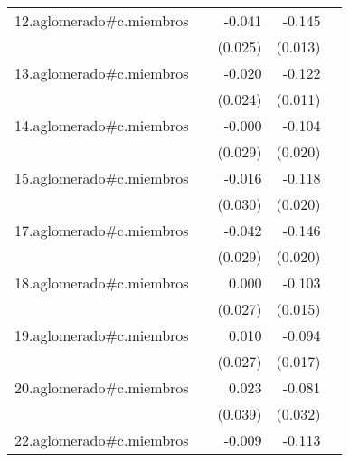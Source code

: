 {\begin{longtable}{l*{4}{D{.}{.}{-1}}}
\addlinespace
12.aglomerado#c.miembros&                     &      -0.041         &      -0.145\sym{***}&                     \\
            &                     &     (0.025)         &     (0.013)         &                     \\
\addlinespace
13.aglomerado#c.miembros&                     &      -0.020         &      -0.122\sym{***}&                     \\
            &                     &     (0.024)         &     (0.011)         &                     \\
\addlinespace
14.aglomerado#c.miembros&                     &      -0.000         &      -0.104\sym{***}&                     \\
            &                     &     (0.029)         &     (0.020)         &                     \\
\addlinespace
15.aglomerado#c.miembros&                     &      -0.016         &      -0.118\sym{***}&                     \\
            &                     &     (0.030)         &     (0.020)         &                     \\
\addlinespace
17.aglomerado#c.miembros&                     &      -0.042         &      -0.146\sym{***}&                     \\
            &                     &     (0.029)         &     (0.020)         &                     \\
\addlinespace
18.aglomerado#c.miembros&                     &       0.000         &      -0.103\sym{***}&                     \\
            &                     &     (0.027)         &     (0.015)         &                     \\
\addlinespace
19.aglomerado#c.miembros&                     &       0.010         &      -0.094\sym{***}&                     \\
            &                     &     (0.027)         &     (0.017)         &                     \\
\addlinespace
20.aglomerado#c.miembros&                     &       0.023         &      -0.081\sym{*}  &                     \\
            &                     &     (0.039)         &     (0.032)         &                     \\
\addlinespace
22.aglomerado#c.miembros&                     &      -0.009         &      -0.113\sym{***}&                     \\

\end{longtable}}
